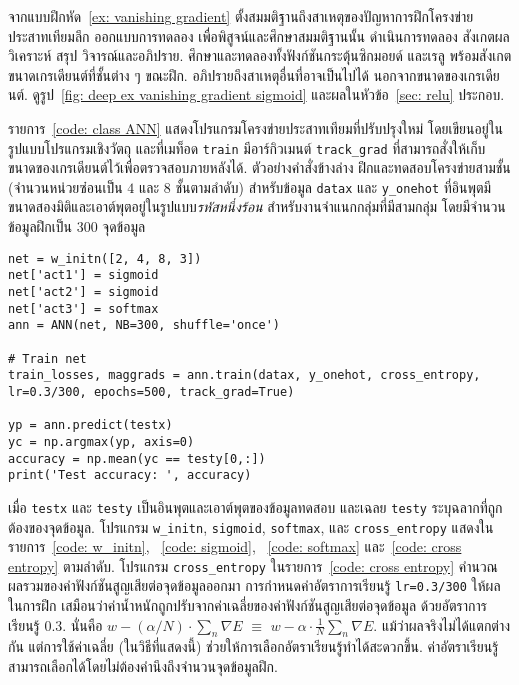 
\begin{Exercise}
	\label{ex: vanishing gradient 2}
	
	จากแบบฝึกหัด~\ref{ex: vanishing gradient}
	ตั้งสมมติฐานถึงสาเหตุของปัญหาการฝึกโครงข่ายประสาทเทียมลึก
	ออกแบบการทดลอง เพื่อพิสูจน์และศึกษาสมมติฐานนั้น
	ดำเนินการทดลอง สังเกตผล วิเคราะห์ สรุป วิจารณ์และอภิปราย.
	ศึกษาและทดลองทั้งฟังก์ชันกระตุ้นซิกมอยด์ และเรลู 
	พร้อมสังเกตขนาดเกรเดียนต์ที่ชั้นต่าง ๆ ขณะฝึก.
	อภิปรายถึงสาเหตุอื่นที่อาจเป็นไปได้ นอกจากขนาดของเกรเดียนต์.
	ดูรูป~\ref{fig: deep ex vanishing gradient sigmoid}
	และผลในหัวข้อ~\ref{sec: relu} ประกอบ.
	
	รายการ~\ref{code: class ANN}
	แสดงโปรแกรมโครงข่ายประสาทเทียมที่ปรับปรุงใหม่ โดยเขียนอยู่ในรูปแบบโปรแกรมเชิงวัตถุ
	และที่เมท็อด \texttt{train} มีอาร์กิวเมนต์ \verb|track_grad| ที่สามารถสั่งให้เก็บขนาดของเกรเดียนต์ไว้เพื่อตรวจสอบภายหลังได้.
	ตัวอย่างคำสั่งข้างล่าง ฝึกและทดสอบโครงข่ายสามชั้น (จำนวนหน่วยซ๋อนเป็น $4$ และ $8$ ชั้นตามลำดับ)
สำหรับข้อมูล \verb|datax| และ \verb|y_onehot|
ที่อินพุตมีขนาดสองมิติและเอาต์พุตอยู่ในรูปแบบ\textit{รหัสหนึ่งร้อน} 
สำหรับงานจำแนกกลุ่มที่มีสามกลุ่ม โดยมีจำนวนข้อมูลฝึกเป็น $300$ จุดข้อมูล
\begin{Verbatim}[fontsize=\small]
net = w_initn([2, 4, 8, 3])
net['act1'] = sigmoid
net['act2'] = sigmoid
net['act3'] = softmax
ann = ANN(net, NB=300, shuffle='once')

# Train net
train_losses, maggrads = ann.train(datax, y_onehot, cross_entropy, 
lr=0.3/300, epochs=500, track_grad=True)

yp = ann.predict(testx)
yc = np.argmax(yp, axis=0)	
accuracy = np.mean(yc == testy[0,:])
print('Test accuracy: ', accuracy)
\end{Verbatim}
เมื่อ \verb|testx| และ \verb|testy|
เป็นอินพุตและเอาต์พุตของข้อมูลทดสอบ และเฉลย \verb|testy| ระบุฉลากที่ถูกต้องของจุดข้อมูล.
โปรแกรม \verb|w_initn|, \verb|sigmoid|, \verb|softmax|, และ \verb|cross_entropy|
แสดงในรายการ~\ref{code: w_initn},
~\ref{code: sigmoid},
~\ref{code: softmax}
และ~\ref{code: cross entropy}
ตามลำดับ.
โปรแกรม \texttt{cross\_entropy} ในรายการ~\ref{code: cross entropy}
คำนวณผลรวมของค่าฟังก์ชันสูญเสียต่อจุดข้อมูลออกมา
การกำหนดค่าอัตราการเรียนรู้ \texttt{lr=0.3/300}
ให้ผลในการฝึก
เสมือนว่าค่าน้ำหนักถูกปรับจากค่าเฉลี่ยของค่าฟังก์ชันสูญเสียต่อจุดข้อมูล
ด้วยอัตราการเรียนรู้ $0.3$.
นั่นคือ $w - (\alpha/N) \cdot \sum_n \nabla E$
$\equiv$ $w - \alpha \cdot \frac{1}{N} \sum_n \nabla E$.
แม้ว่าผลจริงไม่ได้แตกต่างกัน
แต่การใช้ค่าเฉลี่ย (ในวิธีที่แสดงนี้) ช่วยให้การเลือกอัตราเรียนรู้ทำได้สะดวกขึ้น.
ค่าอัตราเรียนรู้ สามารถเลือกได้โดยไม่ต้องคำนึงถึงจำนวนจุดข้อมูลฝึก.


\end{Exercise}
